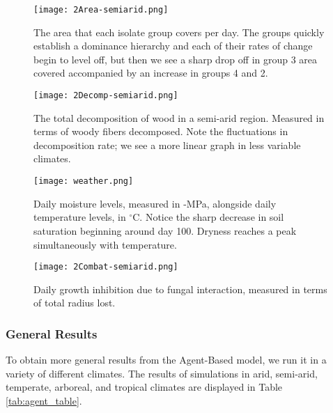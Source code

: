 \documentclass[12pt]{article}
\begin{document}
\begin{figure}[!ht]
    \centering
    \begin{minipage}{0.49\textwidth}
        \centering
        \texttt{[image: 2Area-semiarid.png]}
        \caption{The area that each isolate group covers per day. The groups quickly establish a dominance hierarchy and each of their rates of change begin to level off, but then we see a sharp drop off in group 3 area covered accompanied by an increase in groups 4 and 2.}
        \label{fig:biomass1}
    \end{minipage}\hfill
    \begin{minipage}{0.49\textwidth}
        \texttt{[image: 2Decomp-semiarid.png]}
        \caption{The total decomposition of wood in a semi-arid region. Measured in terms of woody fibers decomposed. Note the fluctuations in decomposition rate; we see a more linear graph in less variable climates.}
        \label{fig:decomp1} 
    \end{minipage}
\end{figure}


\begin{figure}[!ht]
    \centering
    \begin{minipage}{0.49\textwidth}
        \centering
        \texttt{[image: weather.png]}
        \caption{Daily moisture levels, measured in -MPa, alongside daily temperature levels, in $^\circ$C. Notice the sharp decrease in soil saturation beginning around day 100. Dryness reaches a peak simultaneously with temperature.}
        \label{fig:moisture1}
    \end{minipage}\hfill
    \begin{minipage}{0.49\textwidth}
        \texttt{[image: 2Combat-semiarid.png]}
        \caption{Daily growth inhibition due to fungal interaction, measured in terms of total radius lost. }
        \label{fig:combat1} 
    \end{minipage}
\end{figure}



\subsubsection{General Results}
To obtain more general results from the Agent-Based model, we run it in a variety of different climates. The results of simulations in arid, semi-arid, temperate, arboreal, and tropical climates are displayed in Table \ref{tab:agent_table}. 
\end{document}
